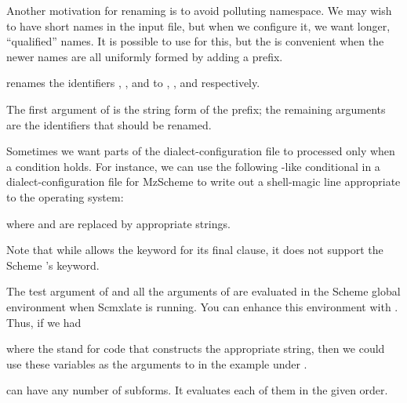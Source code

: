 Another motivation for renaming is to avoid polluting
namespace.  We may wish to have short names in the
input file, but when we configure it, we want longer,
``qualified'' names.  It is possible to use
 for this, but the
 is convenient when the newer names
are all uniformly formed by adding a prefix.


\n renames the identifiers , ,
and  to
, , and
 respectively.

The first argument of  is the
string form of the prefix; the remaining arguments are
the identifiers that should be renamed.


Sometimes we want parts of the dialect-configuration
file to processed only when a condition holds.  For
instance, we can use the following -like
conditional in
a dialect-configuration file for MzScheme to
write out a  shell-magic
line appropriate to the operating system:


\n where  and
 are replaced by
appropriate strings.

Note that while  allows the 
keyword for its final clause, it does not support the
Scheme 's \q{=>} keyword.


The test argument of  and all the
arguments of  are evaluated in the
Scheme global environment when Scmxlate is running.
You can enhance this environment with
.  Thus, if we had


\n where the  stand for code that constructs
the appropriate string, then we could use these
variables as the arguments to  in
the example under .

 can have any number of subforms.
It evaluates each of them in the given order.

